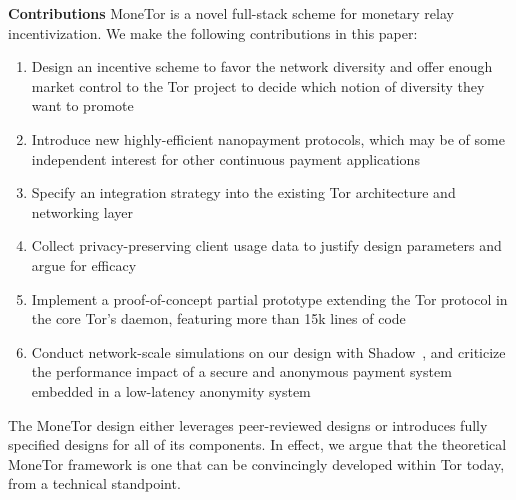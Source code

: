 \textbf{Contributions} MoneTor is a novel full-stack scheme for monetary relay
incentivization. We make the following contributions in this paper:

\begin{enumerate}
\item Design an incentive scheme to favor the network diversity and offer enough market control to the Tor project to decide which notion of diversity they want to promote
\item Introduce new highly-efficient nanopayment protocols, which may be of some
  independent interest for other continuous payment applications
\item Specify an integration strategy into the existing Tor architecture and networking layer
\item Collect privacy-preserving client usage data to justify design parameters
  and argue for efficacy
\item Implement a proof-of-concept partial prototype extending the Tor protocol in the core Tor's daemon, featuring more than 15k lines of code
\item Conduct network-scale simulations on our design with Shadow~\cite{jansen2011shadow}, and criticize the performance impact of a secure and anonymous payment system embedded in a low-latency anonymity system
\end{enumerate}

The MoneTor design either leverages peer-reviewed designs or introduces fully
specified designs for all of its components. In effect, we argue that the
theoretical MoneTor framework is one that can be convincingly developed within
Tor today, from a technical standpoint.